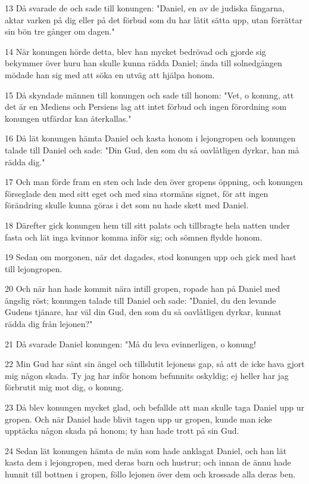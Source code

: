 \par 13 Då svarade de och sade till konungen: "Daniel, en av de judiska fångarna, aktar varken på dig eller på det förbud som du har låtit sätta upp, utan förrättar sin bön tre gånger om dagen."
\par 14 När konungen hörde detta, blev han mycket bedrövad och gjorde sig bekymmer över huru han skulle kunna rädda Daniel; ända till solnedgången mödade han sig med att söka en utväg att hjälpa honom.
\par 15 Då skyndade männen till konungen och sade till honom: "Vet, o konung, att det är en Mediens och Persiens lag att intet förbud och ingen förordning som konungen utfärdar kan återkallas."
\par 16 Då lät konungen hämta Daniel och kasta honom i lejongropen och konungen talade till Daniel och sade: "Din Gud, den som du så oavlåtligen dyrkar, han må rädda dig."
\par 17 Och man förde fram en sten och lade den över gropens öppning, och konungen förseglade den med sitt eget och med sina stormäns signet, för att ingen förändring skulle kunna göras i det som nu hade skett med Daniel.
\par 18 Därefter gick konungen hem till sitt palats och tillbragte hela natten under fasta och lät inga kvinnor komma inför sig; och sömnen flydde honom.
\par 19 Sedan om morgonen, när det dagades, stod konungen upp och gick med hast till lejongropen.
\par 20 Och när han hade kommit nära intill gropen, ropade han på Daniel med ängslig röst; konungen talade till Daniel och sade: "Daniel, du den levande Gudens tjänare, har väl din Gud, den som du så oavlåtligen dyrkar, kunnat rädda dig från lejonen?"
\par 21 Då svarade Daniel konungen: "Må du leva evinnerligen, o konung!
\par 22 Min Gud har sänt sin ängel och tillslutit lejonens gap, så att de icke hava gjort mig någon skada. Ty jag har inför honom befunnits oskyldig; ej heller har jag förbrutit mig mot dig, o konung.
\par 23 Då blev konungen mycket glad, och befallde att man skulle taga Daniel upp ur gropen. Och när Daniel hade blivit tagen upp ur gropen, kunde man icke upptäcka någon skada på honom; ty han hade trott på sin Gud.
\par 24 Sedan lät konungen hämta de män som hade anklagat Daniel, och han lät kasta dem i lejongropen, med deras barn och hustrur; och innan de ännu hade hunnit till bottnen i gropen, föllo lejonen över dem och krossade alla deras ben.
